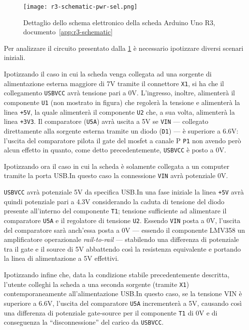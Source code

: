 \begin{figure}[t]
    \centering
    \texttt{[image: r3-schematic-pwr-sel.png]}
    \caption[Dettaglio dello schema elettronico posto in appendice, documento~\ref{app:r3-schematic}]{Dettaglio dello schema elettronico della scheda Arduino Uno R3, documento~\ref{app:r3-schematic}~\cite{site:r3-schematic}}\label{fig:r3-schematic-pwr-sel-detail}
\end{figure}

Per analizzare il circuito presentato dalla \cref{fig:r3-schematic-pwr-sel-detail} è necessario ipotizzare diversi scenari iniziali.

Ipotizzando il caso in cui la scheda venga collegata ad una sorgente di alimentazione esterna maggiore di 7V tramite il connettore \texttt{X1}, si ha che il collegamento \texttt{USBVCC} avrà tensione pari a 0V.
L'ingresso, inoltre, alimenterà il componente \texttt{U1} (non mostrato in figura) che regolerà la tensione e alimenterà la linea \texttt{+5V}, la quale alimenterà il componente \texttt{U2} che, a sua volta, alimenterà la linea \texttt{+3V3}.
Il comparatore (\texttt{U5A}) avrà uscita a 5V se \texttt{VIN} --- collegato direttamente alla sorgente esterna tramite un diodo (\texttt{D1}) --- è superiore a 6.6V: l'uscita del comparatore pilota il gate del mosfet a canale P \texttt{P1} non avendo però alcun effetto in quanto, come detto precedentemente, \texttt{USBVCC} è posto a 0V.

Ipotizzando ora il caso in cui la scheda è solamente collegata a un computer tramite la porta USB.\@ In questo caso la connessione \texttt{VIN} avrà potenziale 0V.

\texttt{USBVCC} avrà potenziale 5V da specifica USB.\@ In una fase iniziale la linea \texttt{+5V} avrà quindi potenziale pari a 4.3V considerando la caduta di tensione del diodo presente all'interno del componente \texttt{T1}; tensione sufficiente ad alimentare il comparatore \texttt{U5A} e il regolatore di tensione \texttt{U2}.
Essendo \texttt{VIN} posta a 0V, l'uscita del comparatore sarà anch'essa posta a 0V --- essendo il componente LMV358 un amplificatore operazionale \textit{rail-to-rail}\cite{ti:lmv358} ---
stabilendo una differenza di potenziale tra il gate e il source di 5V abbattendo così la resistenza equivalente e portando la linea di alimentazione a 5V effettivi\cite{onsemi:fdn340p}.

Ipotizzando infine che, data la condizione stabile precedentemente descritta, l'utente colleghi la scheda a una seconda sorgente (tramite \texttt{X1}) contemporaneamente all'alimentazione USB.\@ In questo caso, se la tensione VIN è superiore a 6.6V, l'uscita del comparatore \texttt{U5A} incrementerà a 5V, causando così una differenza di potenziale gate-source per il componente \texttt{T1} di 0V e di conseguenza la ``disconnessione'' del carico da \texttt{USBVCC}.

